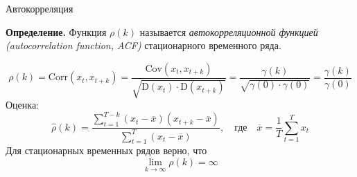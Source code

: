 \begin{frame}{Автокорреляция}

\textbf{Определение.} Функция $\rho(k)$ называется  \textit{автокорреляционной функцией (autocorrelation function, ACF)} стационарного временного ряда.

\begin{equation*}
    \rho(k) = \mathrm{Corr}(x_t, x_{t+k}) = \frac{ \mathrm{Cov}(x_t,x_{t+k}) }{ \sqrt{ \mathrm{D}(x_t) \cdot \mathrm{D}(x_{t+k}) } } = \frac{ \gamma(k) }{ \sqrt{ \gamma(0) \cdot \gamma(0) } } = \frac{ \gamma(k) }{ \gamma(0)}
\end{equation*}
Оценка:
\begin{equation*}
    \hat{\rho}(k) = \frac{ \sum_{t=1}^{T-k}(x_t - \overline{x})(x_{t+k} - \overline{x})}{\sum_{t=1}^{T}(x_t - \overline{x})}, 
    \quad\text{где}\quad\overline{x} = \frac{1}{T}\sum_{t=1}^{T}x_t
\end{equation*}
Для стационарных временных рядов верно, что
\begin{equation*}
    \lim_{k \to \infty} \rho(k) = \infty
\end{equation*}


\end{frame}
